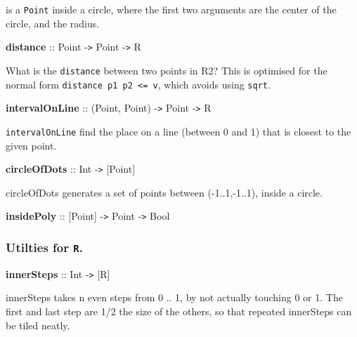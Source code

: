 \hspace{0.05\textwidth}\begin{minipage}{0.9\textwidth}is a {\tt Point} inside a circle, where the first two arguments are the center of the circle, and the radius.
\end{minipage}

 

{{\bf distance} :: Point -{\tt >} Point -{\tt >} R}

\hspace{0.05\textwidth}\begin{minipage}{0.9\textwidth}What is the {\tt distance} between two points in R2? This is optimised for the normal form {\tt distance p1 p2 {\tt <}= v}, which avoids using {\tt sqrt}.\end{minipage}

 

{{\bf intervalOnLine} :: (Point, Point) -{\tt >} Point -{\tt >} R}

\hspace{0.05\textwidth}\begin{minipage}{0.9\textwidth}{\tt intervalOnLine} find the place on a line (between 0 and 1) that is closest to the given point.\end{minipage}

 

{{\bf circleOfDots} :: Int -{\tt >} [Point]}

\hspace{0.05\textwidth}\begin{minipage}{0.9\textwidth}circleOfDots generates a set of points between (-1..1,-1..1), inside a circle.\end{minipage}

 

{{\bf insidePoly} :: [Point] -{\tt >} Point -{\tt >} Bool}

 

\subsubsection{Utilties for {\tt R}.}

 

{{\bf innerSteps} :: Int -{\tt >} [R]}

\hspace{0.05\textwidth}\begin{minipage}{0.9\textwidth}innerSteps takes n even steps from 0 .. 1, by not actually touching 0 or 1. The first and last step are 1/2 the size of the others, so that repeated innerSteps
 can be tiled neatly.
\end{minipage}

